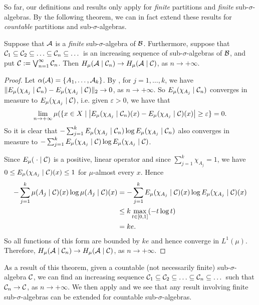 So far, our definitions and results only apply for \emph{finite} partitions and \emph{finite} sub-$\sigma$-algebras. By the following theorem, we can in fact extend these results for \emph{countable} partitions and sub-$\sigma$-algebras.

\begin{theorem} \label{thm:walters-4-7}
	Suppose that $\mathcal{A}$ is a \emph{finite} sub-$\sigma$-algebra of $\mathcal{B}$. Furthermore, suppose that $\C_1 \subset \C_2 \subset \dots \subset \C_n \subset \dots$ is an increasing sequence of sub-$\sigma$-algebras of $\mathcal{B}$, and put $\mathcal{C}:= \bigvee_{n = 1}^\infty{\mathcal{C}_n}$. Then $H_\mu(\mathcal{A} \mid \mathcal{C}_n) \to H_\mu(\mathcal{A} \mid \mathcal{C})$, as $n \to +\infty$.
	\begin{proof}
		Let $\alpha(\mathcal{A}) = \{A_1, \dots, \mathcal{A}_k\}$. By , for $j = 1, \dots, k$, we have $\|E_\mu(\chi_{A_j} \mid \mathcal{C}_n) - E_\mu(\chi_{A_j} \mid \mathcal{C})\|_2 \to 0$, as $n \to +\infty$. So $E_\mu(\chi_{A_j} \mid \mathcal{C}_n)$ converges in measure to $E_\mu(\chi_{A_j} \mid \mathcal{C})$, i.e. given $\varepsilon > 0$, we have that
		\[
			\lim_{n \to +\infty}{\mu(\{x \in X \mid \left|E_\mu(\chi_{A_j} \mid \mathcal{C}_n)(x) - E_\mu(\chi_{A_j} \mid \mathcal{C})(x)\right| \geq \varepsilon\}} = 0.
		\]
		So it is clear that $-\sum_{j = 1}^k{E_\mu(\chi_{A_j} \mid \mathcal{C}_n) \log{E_\mu(\chi_{A_j} \mid \mathcal{C}_n)}}$ also converges in measure to $-\sum_{j = 1}^k{E_\mu(\chi_{A_j} \mid \mathcal{C}) \log{E_\mu(\chi_{A_j} \mid \mathcal{C})}}$.
		
		Since $E_\mu(\mathrel{}\cdot\mathrel{} \mid \mathcal{C})$ is a positive, linear operator and since $\sum_{j = 1}^k{\chi_{A_j}} = 1$, we have $0 \leq E_\mu(\chi_{A_j} \mid \mathcal{C})(x) \leq 1$ for $\mu$-almost every $x$. Hence
		\begin{align*}
			-\sum_{j = 1}^k{\mu(A_j \mid \mathcal{C})(x) \log{\mu(A_j \mid \mathcal{C})(x)}} &= -\sum_{j = 1}^k{E_\mu(\chi_{A_j} \mid \mathcal{C})(x) \log{E_\mu(\chi_{A_j} \mid \mathcal{C})(x)}} \\
				&\leq k \max_{t \in [0, 1]}(-t \log{t}) \\
				&= ke.
		\end{align*}
		So all functions of this form are bounded by $ke$ and hence converge in $L^1(\mu)$. Therefore, $H_\mu(\mathcal{A} \mid \mathcal{C}_n) \to H_\mu(\mathcal{A} \mid \mathcal{C})$, as $n \to +\infty$.
	\end{proof}
\end{theorem}

As a result of this theorem, given a countable (not necessarily finite) sub-$\sigma$-algebra $\mathcal{C}$, we can find an increasing sequence $\C_1 \subset \C_2 \subset \dots \subset \C_n \subset \dots$ such that $\mathcal{C}_n \to \mathcal{C}$, as $n \to +\infty$. We then apply  and we see that any result involving finite sub-$\sigma$-algebras can be extended for countable sub-$\sigma$-algebras.

